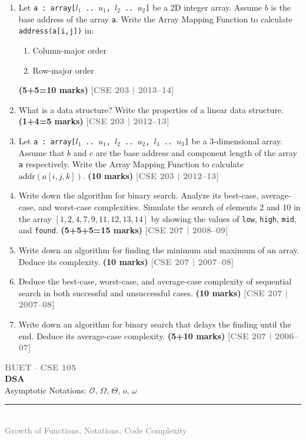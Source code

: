 \documentclass[12pt,a3paper]{article}
\newcommand{\yr}[1]{\hfill\textcolor{gray}{\small\textbf{[#1]}}}
\newcommand{\mk}[1]{\textcolor{orange!70!black}{\small\textbf{(#1 marks)}}}
\newcommand{\secdivider}[4]{%
  \newpage\thispagestyle{empty}%
  \vspace*{\fill}%
  \begin{tcolorbox}[enhanced,colback=#4!7,colframe=#3,boxrule=1.5pt,arc=8pt,
    left=20pt,right=20pt,top=22pt,bottom=22pt,
    shadow={3pt}{-3pt}{0pt}{black!15}]
    \centering
    {\large\textcolor{gray}{\textbf{BUET $\cdot$ CSE 105}}}\\[8pt]
    {\fontsize{26}{32}\selectfont\bfseries\textcolor{#3}{DSA}}\\[6pt]
    {\fontsize{15}{19}\selectfont\textcolor{dgray}{#1}}\\[12pt]
    \textcolor{#3!60}{\rule{0.5\textwidth}{0.5pt}}\\[6pt]
    {\small\textcolor{gray}{#2}}
  \end{tcolorbox}%
  \vspace*{\fill}\newpage%
}
\begin{document}
\begin{enumerate}
\item Let \texttt{a : array[$l_1$\,..\,$u_1$, $l_2$\,..\,$u_2$]} be a 2D integer array. Assume $b$ is the base address of the array \texttt{a}. Write the Array Mapping Function to calculate \texttt{address(a[i,j])} in:
\begin{enumerate}
  \item Column-major order
  \item Row-major order
\end{enumerate}
\mk{5+5=10}
\yr{CSE 203 | 2013--14}

\item What is a data structure? Write the properties of a linear data structure. \mk{1+4=5}
\yr{CSE 203 | 2012--13}

\item Let \texttt{a : array[$l_1$\,..\,$u_1$, $l_2$\,..\,$u_2$, $l_3$\,..\,$u_3$]} be a 3-dimensional array. Assume that $b$ and $c$ are the base address and component length of the array \texttt{a} respectively. Write the Array Mapping Function to calculate $\text{addr}(a[i, j, k])$. \mk{10}
\yr{CSE 203 | 2012--13}

\item Write down the algorithm for binary search. Analyze its best-case, average-case, and worst-case complexities. Simulate the search of elements 2 and 10 in the array $[1, 2, 4, 7, 9, 11, 12, 13, 14]$ by showing the values of \texttt{low}, \texttt{high}, \texttt{mid}, and \texttt{found}. \mk{5+5+5=15}
\yr{CSE 207 | 2008--09}

\item Write down an algorithm for finding the minimum and maximum of an array. Deduce its complexity. \mk{10}
\yr{CSE 207 | 2007--08}

\item Deduce the best-case, worst-case, and average-case complexity of sequential search in both successful and unsuccessful cases. \mk{10}
\yr{CSE 207 | 2007--08}

\item Write down an algorithm for binary search that delays the finding until the end. Deduce its average-case complexity. \mk{5+10}
\yr{CSE 207 | 2006--07}

\end{enumerate}
\newpage

\secdivider{Asymptotic Notations: $\mathcal{O},\,\Omega,\,\Theta,\,o,\,\omega$}{Growth of Functions, Notations, Code Complexity}{cB}{cB}
\end{document}
